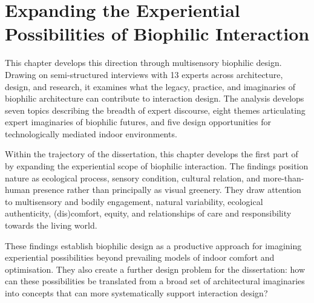 \chapter{Expanding the Experiential Possibilities of Biophilic Interaction}
\label{ch:biophilic-futures}

\begin{synopsis}

This chapter develops this direction through multisensory biophilic design. Drawing on semi-structured interviews with 13 experts across architecture, design, and research, it examines what the legacy, practice, and imaginaries of biophilic architecture can contribute to interaction design. The analysis develops seven topics describing the breadth of expert discourse, eight themes articulating expert imaginaries of biophilic futures, and five design opportunities for technologically mediated indoor environments.

Within the trajectory of the dissertation, this chapter develops the first part of  by expanding the experiential scope of biophilic interaction. The findings position nature as ecological process, sensory condition, cultural relation, and more-than-human presence rather than principally as visual greenery. They draw attention to multisensory and bodily engagement, natural variability, ecological authenticity, (dis)comfort, equity, and relationships of care and responsibility towards the living world.

These findings establish biophilic design as a productive approach for imagining experiential possibilities beyond prevailing models of indoor comfort and optimisation. They also create a further design problem for the dissertation: how can these possibilities be translated from a broad set of architectural imaginaries into concepts that can more systematically support interaction design?
\end{synopsis}


